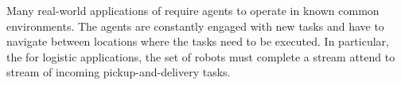Many real-world applications of \mrs require agents to operate
in known common environments. The agents are constantly engaged with new tasks and have
to navigate between locations where the tasks need to be executed. In particular,
the \mrs for logistic applications, the set of robots must complete a stream attend 
to stream of incoming pickup-and-delivery tasks.







